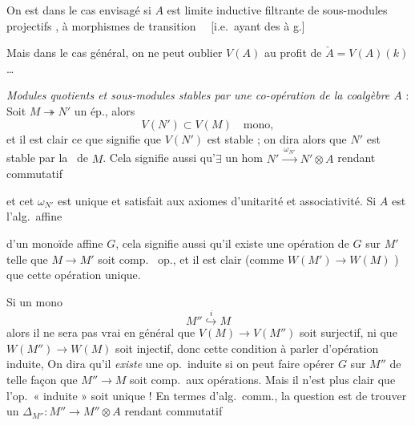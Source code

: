 \documentclass[11pt,a4paper]{article}
\begin{document}
On est dans le cas envisagé \struck{\ill{}} si $A$ est limite inductive filtrante  \emph{} de sous-modules projectifs , à morphismes de transition   \ \ [i.e.\ ayant des  à g.]

Mais dans le cas général, on ne peut oublier $V(A)$  au profit de $\check{A} = V(A)(k)$ …

\emph{Modules quotients et sous-modules stables par une co-opération de la coalgèbre $A$} : Soit $M \twoheadrightarrow N'$ un ép., alors
\[
  V(N') \subset V(M) \quad \text{mono},
\]
et il est clair ce que signifie que $V(N')$ est stable ; on dira alors que $N'$ est stable par la \ de $M$. Cela signifie aussi qu'$\exists$ un hom $N' \xrightarrow{\ \omega_{N'}\ } N' \otimes A$ rendant commutatif


et cet $\omega_{N'}$ est unique et satisfait aux axiomes d'unitarité et associativité. Si $A$ est l'alg.\ affine

d'un monoïde affine $G$, cela signifie aussi qu'il existe une opération de $G$ sur $M'$  telle que $M \to M'$ soit comp.\ \ill{} op., et il est clair (comme $W(M') \to W(M)$ ) que cette opération  unique.

Si \ill{} un mono
\[
  M'' \overset{i}{\hookrightarrow} M
\]
alors il ne sera pas vrai en général que $V(M) \to V(M'')$ soit surjectif, ni que $W(M'') \to W(M)$ soit injectif, donc \ill{} cette condition \ill{} \ill{} \ill{} à parler d'opération induite, \struck{\ill{}} On dira qu'il \emph{existe} une op.\ induite si on peut faire opérer $G$ sur $M''$ de telle façon que $M'' \to M$ soit comp.\ aux opérations. Mais il n'est plus clair que l'op.\ « induite » soit unique ! En termes d'alg.\ comm., la question est de trouver un $\Delta_{M''} : M'' \to M'' \otimes A$ rendant commutatif
\end{document}
